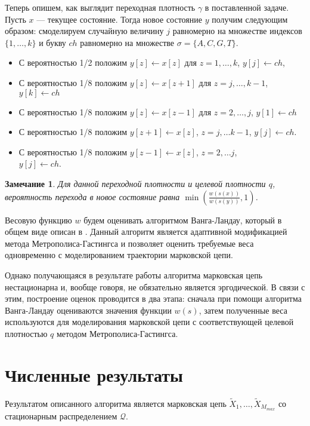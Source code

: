 \documentclass{spisok-article}
\newtheorem{note}{Замечание}
\begin{document}
Теперь опишем, как выглядит переходная плотность $\gamma$ в поставленной задаче. 
Пусть $x$ --- текущее состояние. Тогда новое состояние $y$ получим следующим образом:
смоделируем случайную величину $j$ равномерно на множестве индексов ${\{1, \ldots, k \}}$ и букву $ch$ равномерно на множестве $\sigma = {\{A, C, G, T\}}$.
\begin{itemize}
\item С вероятностью 1/2 положим $y[z] \leftarrow x[z]$ для $z = 1, \ldots, k$, $y[j] \leftarrow ch$, 
\item С вероятностью 1/8 положим $y[z] \leftarrow x[z + 1]$ для $z = j, \ldots, k - 1$, $y[k] \leftarrow ch$
\item С вероятностью 1/8 положим $y[z] \leftarrow x[z - 1]$ для $z = 2, \ldots, j$, $y[1] \leftarrow ch$
\item С вероятностью 1/8 положим $y[z + 1] \leftarrow x[z]$, $z = j, \ldots k - 1$, $y[j] \leftarrow ch$.
\item С вероятностью 1/8 положим $y[z - 1] \leftarrow x[z]$, $z = 2, \ldots j $, \\ $y[j] \leftarrow ch$.
\end{itemize}

\begin{note}
Для данной переходной плотности и целевой плотности $q$, вероятность перехода в новое состояние равна $\min \left(\frac{w(s(x))}{w(s(y))} , 1\right)$.
\end{note}

Весовую функцию $w$ будем оценивать алгоритмом Ванга-Ландау, который в общем виде описан в \cite{wl}. 
Данный алгоритм является адаптивной модификацией метода Метрополиса-Гастингса и позволяет оценить требуемые веса одновременно с моделированием траектории марковской цепи.

Однако получающаяся в результате работы алгоритма марковская цепь нестационарна и, вообще говоря, не обязательно
является эргодической. В связи с этим, построение оценок проводится в два этапа: сначала при помощи алгоритма Ванга-Ландау оцениваются значения функции $w(s)$, затем полученные веса используются для моделирования марковской цепи  с соответствующей целевой плотностью $q$ методом Метрополиса-Гастингса. 


\section{Численные результаты}
Результатом описанного алгоритма является марковская цепь  $\tilde{X}_1,\ldots, \tilde{X}_{M_{max}}$ со стационарным распределением $\mathcal{Q}$.
\end{document}
